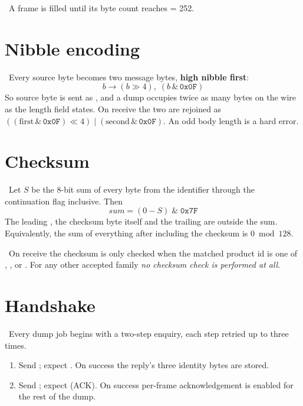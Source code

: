 \estab\ A frame is filled until its byte count reaches  = 252.

\section{Nibble encoding}
\estab\ Every source byte becomes two message bytes, \textbf{high nibble first}:
\[ b \longrightarrow (b \gg 4),\; (b \,\&\, \mathtt{0x0F}) \]
So source byte  is sent as , and a dump occupies twice as many
bytes on the wire as the length field states. On receive the two are rejoined as
$((\mathrm{first} \,\&\, \mathtt{0x0F}) \ll 4) \mathbin{|} (\mathrm{second} \,\&\,
\mathtt{0x0F})$. An odd body length is a hard error.

\section{Checksum}
\estab\ Let $S$ be the 8-bit sum of every byte from the  identifier through the
continuation flag inclusive. Then
\[ \mathit{sum} = (0 - S) \;\&\; \mathtt{0x7F} \]
The leading , the checksum byte itself and the trailing  are outside
the sum. Equivalently, the sum of everything after  including the checksum is
$0 \bmod 128$.

\begin{tcolorbox}[colback=yellow!6!white,colframe=yellow!50!black,title=The checksum is
not always verified]
\estab\ On receive the checksum is only checked when the matched product id is one of
, ,  or . For any other accepted family
\emph{no checksum check is performed at all}.
\end{tcolorbox}

\section{Handshake}
\estab\ Every dump job begins with a two-step enquiry, each step retried up to three times.

\begin{enumerate}
\item Send ; expect .
  On success the reply's three identity bytes are stored.
\item Send ; expect  (ACK). On success
  per-frame acknowledgement is enabled for the rest of the dump.
\end{enumerate}

